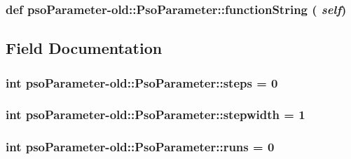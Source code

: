 \hypertarget{classpsoParameter-old_1_1PsoParameter_c764ad674dddf116f274c83caf0f261e}{
\subsubsection{\setlength{\rightskip}{0pt plus 5cm}def psoParameter-old::PsoParameter::functionString ( {\em self})}}
\label{classpsoParameter-old_1_1PsoParameter_c764ad674dddf116f274c83caf0f261e}




\subsection{Field Documentation}
\hypertarget{classpsoParameter-old_1_1PsoParameter_2a963106246f1ee7282300c01cabe96f}{
\subsubsection{\setlength{\rightskip}{0pt plus 5cm}int psoParameter-{\bf old::PsoParameter::steps} = 0}}
\label{classpsoParameter-old_1_1PsoParameter_2a963106246f1ee7282300c01cabe96f}


\hypertarget{classpsoParameter-old_1_1PsoParameter_cbcccf01267ef6a3e61116080360a517}{
\subsubsection{\setlength{\rightskip}{0pt plus 5cm}int psoParameter-old::PsoParameter::stepwidth = 1}}
\label{classpsoParameter-old_1_1PsoParameter_cbcccf01267ef6a3e61116080360a517}


\hypertarget{classpsoParameter-old_1_1PsoParameter_df98537e2d241d4b2b63aac0adbf702d}{
\subsubsection{\setlength{\rightskip}{0pt plus 5cm}int psoParameter-{\bf old::PsoParameter::runs} = 0}}
\label{classpsoParameter-old_1_1PsoParameter_df98537e2d241d4b2b63aac0adbf702d}


